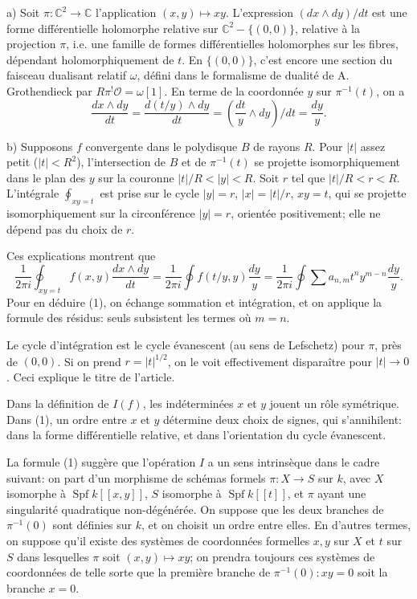 \documentclass[11pt]{article}
\DeclareMathOperator{\Spf}{Spf}
\newcommand{\OO}{\mathcal O}
\newcommand{\CC}{\mathbb C}
\begin{document}
\medskip
\noindent a) Soit $\pi:\CC^2\to\CC$ l'application $(x,y)\mapsto xy$. L'expression $(dx\wedge dy)/dt$ est une forme différentielle holomorphe relative sur $\CC^2-\{(0,0)\}$, relative à la projection $\pi$, i.e. une famille de formes différentielles holomorphes sur les fibres, dépendant holomorphiquement de $t$. En $\{(0,0)\}$, c'est encore une section du faisceau dualisant relatif $\omega$, défini dans le formalisme de dualité de A. Grothendieck par $R\pi^!\OO=\omega[1]$. En terme de la coordonnée $y$ sur $\pi^{-1}(t)$, on a
\[
        \frac{dx\wedge dy}{dt}=\frac{d(t/y)\wedge dy}{dt}
        =\left(\frac{dt}{y}\wedge dy\right)/dt=\frac{dy}{y}.
\]

\noindent b) Supposons $f$ convergente dans le polydisque $B$ de rayons $R$. Pour $|t|$ assez petit ($|t|<R^2$), l'intersection de $B$ et de $\pi^{-1}(t)$ se projette isomorphiquement dans le plan des $y$ sur la couronne $|t|/R<|y|<R$. Soit $r$ tel que $|t|/R<r<R$. L'intégrale $\oint_{xy=t}$ est prise sur le cycle $|y|=r$, $|x|=|t|/r$, $xy=t$, qui se projette isomorphiquement sur la circonférence $|y|=r$, orientée positivement; elle ne dépend pas du choix de $r$.

Ces explications montrent que
\[
\frac{1}{2\pi i}\oint_{xy=t} f(x,y)\frac{dx\wedge dy}{dt}
=\frac{1}{2\pi i}\oint f(t/y,y)\frac{dy}{y}
=\frac{1}{2\pi i}\oint \sum a_{n,m}t^n y^{m-n}\frac{dy}{y}.
\]
Pour en déduire (1), on échange sommation et intégration, et on applique la formule des résidus: seuls subsistent les termes où $m=n$.

Le cycle d'intégration est le cycle évanescent (au sens de Lefschetz) pour $\pi$, près de $(0,0)$. Si on prend $r=|t|^{1/2}$, on le voit effectivement disparaître pour $|t|\to0$. Ceci explique le titre de l'article.

Dans la définition de $I(f)$, les indéterminées $x$ et $y$ jouent un rôle symétrique. Dans (1), un ordre entre $x$ et $y$ détermine deux choix de signes, qui s'annihilent: dans la forme différentielle relative, et dans l'orientation du cycle évanescent.

La formule (1) suggère que l'opération $I$ a un sens intrinsèque dans le cadre suivant: on part d'un morphisme de schémas formels $\pi:X\to S$ sur $k$, avec $X$ isomorphe à $\Spf k[[x,y]]$, $S$ isomorphe à $\Spf k[[t]]$, et $\pi$ ayant une singularité quadratique non-dégénérée. On suppose que les deux branches de $\pi^{-1}(0)$ sont définies sur $k$, et on choisit un ordre entre elles. En d'autres termes, on suppose qu'il existe des systèmes de coordonnées formelles $x,y$ sur $X$ et $t$ sur $S$ dans lesquelles $\pi$ soit $(x,y)\mapsto xy$; on prendra toujours ces systèmes de coordonnées de telle sorte que la première branche de $\pi^{-1}(0):xy=0$ soit la branche $x=0$.
\end{document}
